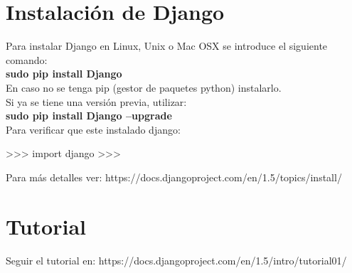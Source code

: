 \section{Instalación de Django}

Para instalar Django en Linux, Unix o Mac OSX se introduce el siguiente comando:\\

\textbf{sudo pip install Django}\\

En caso no se tenga pip (gestor de paquetes python) instalarlo.\\

Si ya se tiene una versión previa, utilizar:\\

\textbf{sudo pip install Django --upgrade}\\

Para verificar que este instalado django:\\

\begin{pyglist} [language=python]
>>> import django
>>> 
\end{pyglist}

Para más detalles ver: https://docs.djangoproject.com/en/1.5/topics/install/\\

\section{Tutorial}

Seguir el tutorial en: https://docs.djangoproject.com/en/1.5/intro/tutorial01/